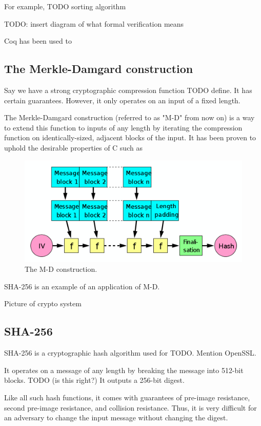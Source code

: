 \documentclass[twocolumn,showpacs,%
  nofootinbib,aps,superscriptaddress,%
  eqsecnum,prd,notitlepage,showkeys,10pt]{revtex4-1}
\begin{document}
For example, TODO sorting algorithm

TODO: insert diagram of what formal verification means

Coq has been used to

\subsection{The Merkle-Damgard construction}
Say we have a strong cryptographic compression function TODO define. It has certain guarantees. However, it only operates on an input of a fixed length.

The Merkle-Damgard construction (referred to as "M-D" from now on) is a way to extend this function to inputs of any length by iterating the compression function on identically-sized, adjacent blocks of the input. It has been proven to uphold the desirable properties of C such as

\begin{figure}[h!]
	\centering
	\includegraphics[scale=0.24]{Merkle-Damgard}
	\caption{The M-D construction.}
\end{figure}

SHA-256 is an example of an application of M-D.

Picture of crypto system 

\subsection{SHA-256}

SHA-256 is a cryptographic hash algorithm used for TODO. Mention OpenSSL.

It operates on a message of any length by breaking the message into 512-bit blocks. TODO (is this right?) It outputs a 256-bit digest. 

Like all such hash functions, it comes with guarantees of pre-image resistance, second pre-image resistance, and collision resistance. Thus, it is very difficult for an adversary to change the input message without changing the digest.
\end{document}
